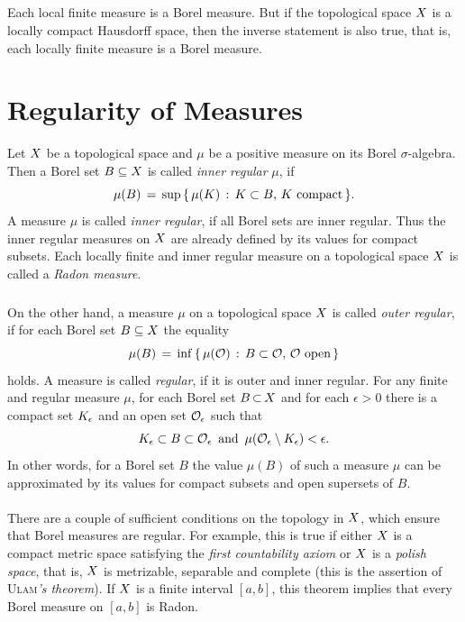 \documentclass[11pt,twoside]{article}
\begin{document}
\subparagraph{}
Each local finite measure is a Borel measure.
But if the topological space $X$ is a locally compact Hausdorff space,
then the inverse statement is also true,
that is,
each locally finite measure is a Borel measure.

\section{Regularity of Measures}
Let $X$ be a topological space and $\mu$ be a positive measure on its
Borel $\sigma$-algebra.
Then a Borel set $B \subseteq X$
is called \textit{inner regular} {\wrt} $\mu$, if
\[
\mu(B) \,=\, \sup \,
\{ \, \mu({K}) \,: \, {K} \subset B, \, {K} \mbox{ compact} \, \}.
\]
A measure $\mu$ is called \textit{inner regular},
if all Borel sets are inner regular.
Thus the inner regular measures on $X$ are already defined
by its values for compact subsets.
Each locally finite and inner regular measure on a topological space
$X$ is called a \textit{Radon measure}.

\subparagraph{}
On the other hand,
a measure $\mu$ on a topological space $X$
is called \textit{outer regular},
if for each Borel set $B \subseteq X$ the equality
\[
\mu(B) \,=\, \inf \,
          \{ \, \mu(\mathcal{O}) \,: \, B \subset \mathcal{O}, \, \mathcal{O} \mbox{ open} \, \}
\]
holds.
A measure is called \textit{regular},
if it is outer and inner regular.
For any finite and regular measure $\mu$,
for each Borel set $B {\,\subset\,} X$ and for each $\epsilon > 0$
there is a compact set ${K}_{\epsilon}$
and an open set $\mathcal{O}_{\epsilon}$
such that
\[
{K}_{\epsilon} \subset B \subset \mathcal{O}_{\epsilon}
\, \mbox{ and } \,
\mu(\mathcal{O}_{\epsilon} \setminus {K}_{\epsilon}) < \epsilon.
\]
In other words,
for a Borel set $B$
the value $\mu(B)$ of such a measure $\mu$ can be approximated
by its values for compact subsets and open supersets of $B$.

\paragraph*{}
There are a couple of sufficient conditions on the topology in $X$,
which ensure
that Borel measures are regular.
For example,
this is true
if either $X$ is a compact metric space satisfying the
\textit{first countability axiom}
or $X$ is a \textit{polish space},
that is,  
$X$ is metrizable, separable and complete
(this is the assertion of \textsc{Ulam}\textit{'s theorem}).
If $X$ is a finite interval $[a,b]$,
this theorem implies
that every Borel measure on $[a,b]$ is Radon.
\end{document}
